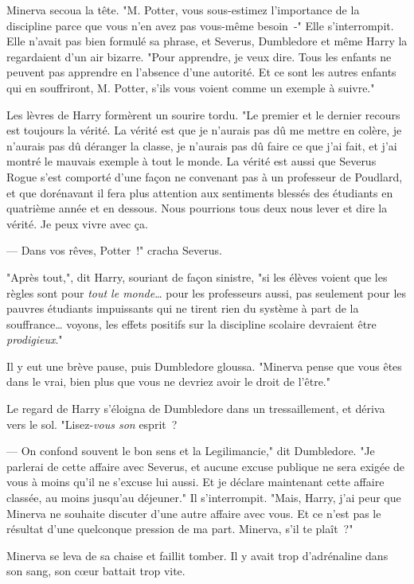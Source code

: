 Minerva secoua la tête. "M. Potter, vous sous-estimez l'importance de la discipline parce que vous n'en avez pas vous-même besoin~-" Elle s'interrompit. Elle n'avait pas bien formulé sa phrase, et Severus, Dumbledore et même Harry la regardaient d'un air bizarre. "Pour apprendre, je veux dire. Tous les enfants ne peuvent pas apprendre en l'absence d'une autorité. Et ce sont les autres enfants qui en souffriront, M. Potter, s'ils vous voient comme un exemple à suivre."

Les lèvres de Harry formèrent un sourire tordu. "Le premier et le dernier recours est toujours la vérité. La vérité est que je n'aurais pas dû me mettre en colère, je n'aurais pas dû déranger la classe, je n'aurais pas dû faire ce que j'ai fait, et j'ai montré le mauvais exemple à tout le monde. La vérité est aussi que Severus Rogue s'est comporté d'une façon ne convenant pas à un professeur de Poudlard, et que dorénavant il fera plus attention aux sentiments blessés des étudiants en quatrième année et en dessous. Nous pourrions tous deux nous lever et dire la vérité. Je peux vivre avec ça.

--- Dans vos rêves, Potter~!" cracha Severus.

"Après tout,", dit Harry, souriant de façon sinistre, "si les élèves voient que les règles sont pour \emph{tout le monde}… pour les professeurs aussi, pas seulement pour les pauvres étudiants impuissants qui ne tirent rien du système à part de la souffrance… voyons, les effets positifs sur la discipline scolaire devraient être \emph{prodigieux}."

Il y eut une brève pause, puis Dumbledore gloussa. "Minerva pense que vous êtes dans le vrai, bien plus que vous ne devriez avoir le droit de l'être."

Le regard de Harry s'éloigna de Dumbledore dans un tressaillement, et dériva vers le sol. "Lisez-\emph{vous son} esprit~?

--- On confond souvent le bon sens et la Legilimancie," dit Dumbledore. "Je parlerai de cette affaire avec Severus, et aucune excuse publique ne sera exigée de vous à moins qu'il ne s'excuse lui aussi. Et je déclare maintenant cette affaire classée, au moins jusqu'au déjeuner." Il s'interrompit. "Mais, Harry, j'ai peur que Minerva ne souhaite discuter d'une autre affaire avec vous. Et ce n'est pas le résultat d'une quelconque pression de ma part. Minerva, s'il te plaît~?"

Minerva se leva de sa chaise et faillit tomber. Il y avait trop d'adrénaline dans son sang, son cœur battait trop vite.

